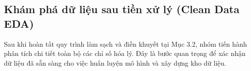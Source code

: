 



\subsection{Khám phá dữ liệu sau tiền xử lý (Clean Data EDA)}
Sau khi hoàn tất quy trình làm sạch và điền khuyết tại Mục 3.2, nhóm tiến hành phân tích chi tiết toàn bộ các chỉ số hóa lý. Đây là bước quan trọng để xác nhận dữ liệu đã sẵn sàng cho việc huấn luyện mô hình và xây dựng kho dữ liệu.

